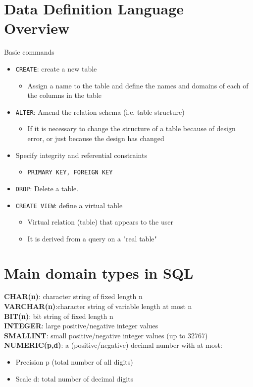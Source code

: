 \documentclass{article}[18pt]
\begin{document}
\section{Data Definition Language Overview}
Basic commands
\begin{itemize}
	\item \texttt{CREATE}: create a new table
	\begin{itemize}
		\item Assign a name to the table and define the names and domains of each of the columns in the table
	\end{itemize}
	\item \texttt{ALTER}: Amend the relation schema (i.e. table structure)
	\begin{itemize}
		\item If it is necessary to change the structure of a table because of design error, or just because the design has changed
	\end{itemize}
	\item Specify integrity and referential constraints
	\begin{itemize}
		\item \texttt{PRIMARY KEY, FOREIGN KEY}
	\end{itemize}
	\item \texttt{DROP}: Delete a table. 
	\item \texttt{CREATE VIEW}: define a virtual table
	\begin{itemize}
		\item Virtual relation (table) that appears to the user
		\item It is derived from a query on a "real table"
	\end{itemize}
\end{itemize}
\section{Main domain types in SQL}
\textbf{CHAR(n)}: character string of fixed length n\\
\textbf{VARCHAR(n)}:character string of variable length at most n\\
\textbf{BIT(n)}: bit string of fixed length n\\
\textbf{INTEGER}: large positive/negative integer values\\
\textbf{SMALLINT}: small positive/negative integer values (up to 32767)\\
\textbf{NUMERIC(p,d)}: a (positive/negative) decimal number with at most:
\begin{itemize}
	\item Precision p (total number of all digits)
	\item Scale d: total number of decimal digits
\end{itemize}
\end{document}
